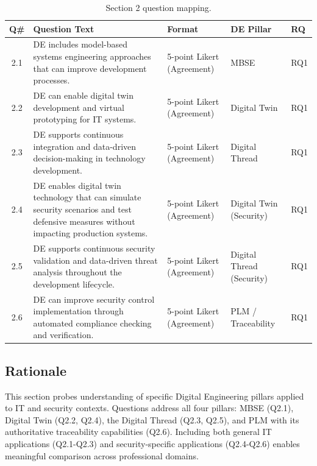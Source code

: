   \begin{table}[H]
    \centering
    \caption{Section 2 question mapping.}
    \label{tab:section2-mapping}
    \small
    \begin{tabular}{@{}cp{2.8in}p{0.9in}p{0.9in}l@{}}
      \toprule
      \textbf{Q\#} & \textbf{Question Text} & \textbf{Format} & \textbf{DE Pillar} & \textbf{RQ} \\
      \midrule
      2.1 & DE includes model-based systems engineering approaches that can improve development processes. & 5-point Likert (Agreement) & MBSE & RQ1 \\
      2.2 & DE can enable digital twin development and virtual prototyping for IT systems. & 5-point Likert (Agreement) & Digital Twin & RQ1 \\
      2.3 & DE supports continuous integration and data-driven decision-making in technology development. & 5-point Likert (Agreement) & Digital Thread & RQ1 \\
      2.4 & DE enables digital twin technology that can simulate security scenarios and test defensive measures without impacting production systems. & 5-point Likert (Agreement) & Digital Twin (Security) & RQ1 \\
      2.5 & DE supports continuous security validation and data-driven threat analysis throughout the development lifecycle. & 5-point Likert (Agreement) & Digital Thread (Security) & RQ1 \\
      2.6 & DE can improve security control implementation through automated compliance checking and verification. & 5-point Likert (Agreement) & PLM / Traceability & RQ1 \\
      \bottomrule
    \end{tabular}
  \end{table}

  \subsection{Rationale}

  This section probes understanding of specific Digital Engineering pillars applied to IT and security contexts. Questions address all four pillars: MBSE (Q2.1), Digital Twin (Q2.2, Q2.4), the Digital Thread (Q2.3, Q2.5), and PLM with its authoritative traceability capabilities (Q2.6). Including both general IT applications (Q2.1-Q2.3) and security-specific applications (Q2.4-Q2.6) enables meaningful comparison across professional domains.

